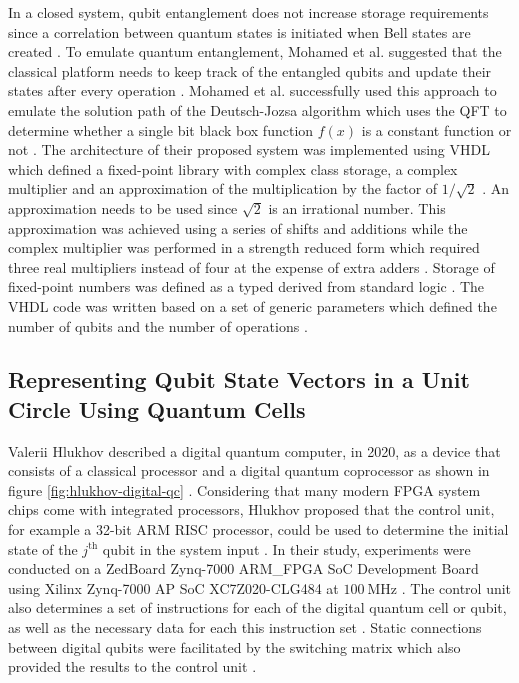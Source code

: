 In a closed system, qubit entanglement does not increase storage requirements since a correlation between quantum states is initiated when Bell states are created \cite{mohamed2009using}. To emulate quantum entanglement, Mohamed et al. suggested that the classical platform needs to keep track of the entangled qubits and update their states after every operation \cite{mohamed2009using}. Mohamed et al. successfully used this approach to emulate the solution path of the Deutsch-Jozsa algorithm which uses the QFT to determine whether a single bit black box function $f(x)$ is a constant function or not \cite{mohamed2009using, Nielsen2010}. The architecture of their proposed system was implemented using VHDL which defined a fixed-point library with complex class storage, a complex multiplier and an approximation of the multiplication by the factor of $1/\sqrt{2}$ \cite{mohamed2009using}. An approximation needs to be used since $\sqrt{2}$ is an irrational number. This approximation was achieved using a series of shifts and additions while the complex multiplier was performed in a strength reduced form which required three real multipliers instead of four at the expense of extra adders \cite{mohamed2009using}. Storage of fixed-point numbers was defined as a typed derived from standard logic \cite{mohamed2009using}. The VHDL code was written based on a set of generic parameters which defined the number of qubits and the number of operations \cite{mohamed2009using}. 

\subsection{Representing Qubit State Vectors in a Unit Circle Using Quantum Cells}

Valerii Hlukhov described a digital quantum computer, in 2020, as a device that consists of a classical processor and a digital quantum coprocessor as shown in figure \ref{fig:hlukhov-digital-qc} \cite{Hlukhov2021}. Considering that many modern FPGA system chips come with integrated processors, Hlukhov proposed that the control unit, for example a 32-bit ARM RISC processor, could be used to determine the initial state of the $j^\text{th}$ qubit in the system input \cite{Hlukhov2021}. In their study, experiments were conducted on a ZedBoard Zynq-7000 ARM\_FPGA SoC Development Board using Xilinx Zynq-7000 AP SoC XC7Z020-CLG484 at $\SI{100}{\mega\hertz}$ \cite{Hlukhov2021}. The control unit also determines a set of instructions for each of the digital quantum cell or qubit, as well as the necessary data for each this instruction set \cite{Hlukhov2021}. Static connections between digital qubits were facilitated by the switching matrix which also provided the results to the control unit \cite{Hlukhov2021}.

